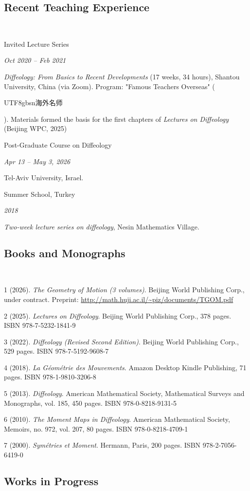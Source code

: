 \documentclass[11pt,reqno]{amsart}
\newlength{\datewidth}
\newcommand{\dateditem}[2]{\noindent\hangindent=0.5cm #1 \hfill \parbox[t]{\datewidth}{\raggedleft\itshape #2}\vspace{.2ex}\par}
\newcommand{\bookitem}[4]{\noindent\hangindent=0.5cm #1 (#2). \emph{#3}. #4\vspace{.5ex}\par}
\begin{document}
  \subsection*{Recent Teaching Experience} \null\
  
  \dateditem{Invited Lecture Series}{Oct 2020 – Feb 2021}
  \emph{Diffeology: From Basics to Recent Developments} (17 weeks, 34 hours), Shantou University, China (via Zoom).
  Program: "Famous Teachers Overseas" (\begin{CJK}{UTF8}{gbsn}海外名师\end{CJK}).
  Materials formed the basis for the first chapters of \textit{Lectures on Diffeology} (Beijing WPC, 2025)
  
  \dateditem{Post-Graduate Course on Diffeology}{Apr 13 – May 3, 2026}
  Tel-Aviv University, Israel.
  
  \dateditem{Summer School, Turkey}{2018}
  \emph{Two-week lecture series on diffeology}, Nesin Mathematics Village.
  
  \subsection*{Books and Monographs} \null\
  
  \bookitem{1}{2026}{The Geometry of Motion (3 volumes)}{Beijing World Publishing Corp., under contract. Preprint: \url{http://math.huji.ac.il/~piz/documents/TGOM.pdf}}
  
  \bookitem{2}{2025}{Lectures on Diffeology}{Beijing World Publishing Corp., 378 pages. ISBN 978-7-5232-1841-9}
  
  \bookitem{3}{2022}{Diffeology (Revised Second Edition)}{Beijing World Publishing Corp., 529 pages. ISBN 978-7-5192-9608-7}
  
  \bookitem{4}{2018}{La Géométrie des Mouvements}{Amazon Desktop Kindle Publishing, 71 pages. ISBN 978-1-9810-3206-8}
  
  \bookitem{5}{2013}{Diffeology}{American Mathematical Society, Mathematical Surveys and Monographs, vol. 185, 450 pages. ISBN 978-0-8218-9131-5}
  
  \bookitem{6}{2010}{The Moment Maps in Diffeology}{American Mathematical Society, Memoirs, no. 972, vol. 207, 80 pages. ISBN 978-0-8218-4709-1}
  
  \bookitem{7}{2000}{Symétries et Moment}{Hermann, Paris, 200 pages. ISBN 978-2-7056-6419-0}
  
  \subsection*{Works in Progress} \null\
  
\end{document}
